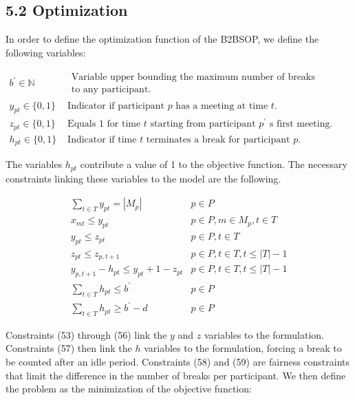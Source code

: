 \documentclass[10pt]{article}
\begin{document}
\subsection*{5.2 Optimization}
In order to define the optimization function of the B2BSOP, we define the following variables:

$$
\begin{array}{ll}
b^{\prime} \in \mathbb{N} & \begin{array}{l}
\text { Variable upper bounding the maximum number of breaks assigned } \\
\text { to any participant. }
\end{array} \\
y_{p t} \in\{0,1\} & \text { Indicator if participant } p \text { has a meeting at time } t . \\
z_{p t} \in\{0,1\} & \text { Equals } 1 \text { for time } t \text { starting from participant } p^{\prime} \text { s first meeting. } \\
h_{p t} \in\{0,1\} & \text { Indicator if time } t \text { terminates a break for participant } p .
\end{array}
$$

The variables $h_{p t}$ contribute a value of 1 to the objective function. The necessary constraints linking these variables to the model are the following.

\[
\begin{array}{rl}
\sum_{t \in T} y_{p t}=\left|M_{p}\right| & p \in P \\
x_{m t} \leq y_{p t} & p \in P, m \in M_{p}, t \in T \\
y_{p t} \leq z_{p t} & p \in P, t \in T \\
z_{p t} \leq z_{p, t+1} & p \in P, t \in T, t \leq|T|-1 \\
y_{p, t+1}-h_{p t} \leq y_{p t}+1-z_{p t} & p \in P, t \in T, t \leq|T|-1 \\
\sum_{t \in T} h_{p t} \leq b^{\prime} & p \in P \\
\sum_{t \in T} h_{p t} \geq b^{\prime}-d & p \in P \tag{59}
\end{array}
\]

Constraints (53) through (56) link the $y$ and $z$ variables to the formulation. Constraints (57) then link the $h$ variables to the formulation, forcing a break to be counted after an idle period. Constraints (58) and (59) are fairness constraints that limit the difference in the number of breaks per participant. We then define the problem as the minimization of the objective function:
\end{document}
